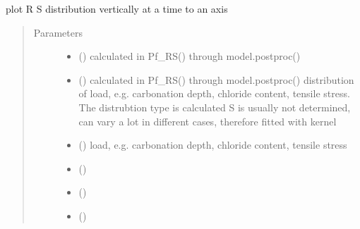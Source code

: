 \documentclass[letterpaper,10pt,english]{sphinxmanual}
\begin{document}
\begin{fulllineitems}
\label{\detokenize{helper_func:helper_func.RS_plot}}
\sphinxAtStartPar
plot R S distribution vertically at a time to an axis
\begin{quote}\begin{description}
\item[{Parameters}] \leavevmode\begin{itemize}
\item {} 
\sphinxAtStartPar
{} (\sphinxstyleliteralemphasis{\sphinxupquote{, }}) \textendash{} calculated in Pf\_RS() through model.postproc()

\item {} 
\sphinxAtStartPar
{} () \textendash{} calculated in Pf\_RS() through model.postproc()
distribution of load, e.g. carbonation depth, chloride content, tensile     stress. The distrubtion type is calculated S is usually not determined, can vary a lot in different cases, therefore fitted with kernel

\item {} 
\sphinxAtStartPar
{} () \textendash{} load, e.g. carbonation depth, chloride content, tensile stress

\item {} 
\sphinxAtStartPar
{} () \textendash{} 

\item {} 
\sphinxAtStartPar
{} () \textendash{} 

\item {} 
\sphinxAtStartPar
{} () \textendash{} 

\end{itemize}

\end{description}\end{quote}

\end{fulllineitems}
\end{document}
